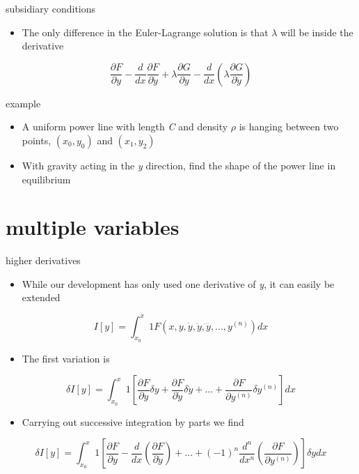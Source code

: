 \documentclass[
  letterpaper,
  ignorenonframetext,
  aspectratio=43,
  handout,
  12pt]{beamer}
\providecommand{\tightlist}{%
  \setlength{\itemsep}{0pt}\setlength{\parskip}{0pt}}
\providecommand{\tightlist}{%
\setlength{\itemsep}{0pt}\setlength{\parskip}{0pt}}
\begin{document}
\begin{frame}{subsidiary conditions}
\protect\hypertarget{subsidiary-conditions-5}{}
\begin{itemize}
\tightlist
\item
  The only difference in the Euler-Lagrange solution is that \(\lambda\)
  will be inside the derivative
\end{itemize}

\[\frac{\partial F}{\partial y} - \frac{d}{dx} \frac{\partial F}{\partial \dot{y}} + \lambda \frac{\partial G}{\partial y} - \frac{d}{dx} \left(\lambda \frac{\partial G}{\partial \dot{y}}\right)\]
\end{frame}

\begin{frame}{example}
\protect\hypertarget{example-1}{}
\begin{itemize}
\tightlist
\item
  A uniform power line with length \emph{C} and density \(\rho\) is
  hanging between two points, \((x_0,y_0)\) and \((x_1,y_2)\)
\item
  With gravity acting in the \emph{y} direction, find the shape of the
  power line in equilibrium
\end{itemize}
\end{frame}

\hypertarget{multiple-variables}{%
\section{multiple variables}\label{multiple-variables}}

\begin{frame}{higher derivatives}
\protect\hypertarget{higher-derivatives}{}
\begin{itemize}
\tightlist
\item
  While our development has only used one derivative of \emph{y}, it can
  easily be extended
\end{itemize}

\[I[y] = \int_{x_0}^x{1} F(x,y,\dot{y},\ddot{y},\dddot{y},...,y^{(n)}) dx\]

\begin{itemize}
\tightlist
\item
  The first variation is
\end{itemize}

\[\delta I[y] = \int_{x_0}^x{1} \left[ \frac{\partial F}{\partial y} \delta y + \frac{\partial F}{\partial \dot{y}}\delta \dot{y} + ... + \frac{\partial F}{\partial y^{(n)}} \delta y^{(n)}\right]dx\]

\begin{itemize}
\tightlist
\item
  Carrying out successive integration by parts we find
\end{itemize}

\[\delta I[y] = \int_{x_0}^x{1} \left[ \frac{\partial F}{\partial y} - \frac{d}{dx}\left( \frac{\partial F}{\partial \dot{y}}\right) + ... + (-1)^n \frac{d^{n}}{dx^{n}}\left(\frac{\partial F}{\partial y^{(n)}}\right)\right] \delta ydx\]
\end{frame}
\end{document}
